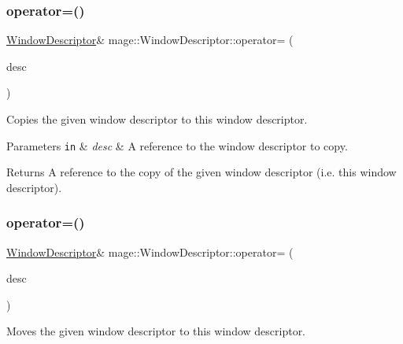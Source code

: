 \subsubsection{\texorpdfstring{operator=()}{operator=()}\hspace{0.1cm}{\footnotesize\ttfamily [1/2]}}
{\footnotesize\ttfamily \mbox{\hyperlink{classmage_1_1_window_descriptor}{Window\+Descriptor}}\& mage\+::\+Window\+Descriptor\+::operator= (\begin{DoxyParamCaption}\item[{const \mbox{\hyperlink{classmage_1_1_window_descriptor}{Window\+Descriptor}} \&}]{desc }\end{DoxyParamCaption})\hspace{0.3cm}{\ttfamily [delete]}}

Copies the given window descriptor to this window descriptor.


\begin{DoxyParams}[1]{Parameters}
\mbox{\tt in}  & {\em desc} & A reference to the window descriptor to copy. \\
\hline
\end{DoxyParams}
\begin{DoxyReturn}{Returns}
A reference to the copy of the given window descriptor (i.\+e. this window descriptor). 
\end{DoxyReturn}
\mbox{\label{classmage_1_1_window_descriptor_a314e45a7cac3a68caefd8b05ddc86040}} 
\subsubsection{\texorpdfstring{operator=()}{operator=()}\hspace{0.1cm}{\footnotesize\ttfamily [2/2]}}
{\footnotesize\ttfamily \mbox{\hyperlink{classmage_1_1_window_descriptor}{Window\+Descriptor}}\& mage\+::\+Window\+Descriptor\+::operator= (\begin{DoxyParamCaption}\item[{\mbox{\hyperlink{classmage_1_1_window_descriptor}{Window\+Descriptor}} \&\&}]{desc }\end{DoxyParamCaption})\hspace{0.3cm}{\ttfamily [delete]}}

Moves the given window descriptor to this window descriptor.


